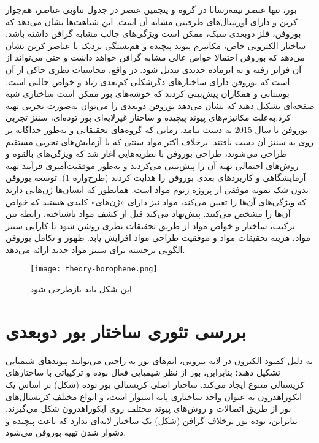 بور، تنها عنصر نیمه‌رسانا در گروه  و پنجمین عنصر در جدول تناوبی عناصر، هم‌جوار کربن و دارای اوربیتال‌های ظرفیتی مشابه آن است. \cite{forteInitioPredictionBoron2010}این شباهت‌ها نشان می‌دهد که بوروفن، فلز دوبعدی سبک، ممکن است ویژگی‌های جالب مشابه گرافن داشته باشد. \cite{huangTwoDimensionalBoronPolymorphs2017, liuIntermixingPeriodicSelfassembly2018} ساختار الکترونی خاص، مکانیزم پیوند پیچیده و هم‌بستگی نزدیک با عناصر کربن نشان می‌دهد که بوروفن احتمالا خواص عالی مشابه گرافن خواهد داشت و حتی می‌تواند از آن فراتر رفته و به ابرماده جدیدی تبدیل شود. در واقع، محاسبات نظری حاکی از آن است که بوروفن دارای ساختارهای دگرشکلی کم‌بعدی زیاد و خواص جالبی است. \cite{liuBorophenegrapheneHeterostructures2019} بوستانی و همکاران \cite{boustaniSYSTEMATICLSDINVESTIGATION1994} پیش‌بینی کردند که خوشه‌های بور ممکن است ساختاری شبه صفحه‌ای تشکیل دهند که نشان می‌دهد بوروفن دوبعدی را می‌توان به‌صورت تجربی تهیه کرد.به‌علت مکانیزم‌های پیوند پیچیده و ساختار غیرلایه‌ای بور توده‌ای، سنتز تجربی بوروفن تا سال 2015 به دست نیامد، زمانی که گروه‌های تحقیقاتی  \cite{mannixSynthesisBorophenesAnisotropic2015} و  \cite{fengExperimentalRealizationTwodimensional2016} به‌طور جداگانه بر روی  به سنتز آن دست یافتند. برخلاف اکثر مواد سنتی که با آزمایش‌های تجربی مستقیم طراحی می‌شوند، طراحی بوروفن با نظریه‌هایی آغاز شد که ویژگی‌های بالقوه و روش‌های احتمالی تهیه آن را پیش‌بینی می‌کردند و به‌طور موفقیت‌آمیزی فرآیند تهیه آزمایشگاهی و کاربردهای بعدی بوروفن را هدایت کردند (طرح‌واره 1). توسعه بوروفن بدون شک نمونه موفقی از پروژه ژنوم مواد  است. همانطور که انسان‌ها ژن‌هایی دارند که ویژگی‌های آن‌ها را تعیین می‌کند، مواد نیز دارای «ژن‌های» کلیدی هستند که خواص آن‌ها را مشخص می‌کنند.  پیش‌نهاد می‌کند قبل از کشف مواد ناشناخته، رابطه بین ترکیب، ساختار و خواص مواد از طریق تحقیقات نظری روشن شود تا کارایی سنتز مواد، هزینه تحقیقات مواد و موفقیت طراحی مواد افزایش یابد. ظهور و تکامل بوروفن الگویی برجسته برای سنتز مواد جدید ارائه می‌دهد.
\begin{figure*}
    \centering
    \texttt{[image: theory-borophene.png]}
    \caption{این شکل باید بازطرحی شود}
    \label{theoryborophene}
\end{figure*}
\section{بررسی تئوری ساختار بور دوبعدی}
به دلیل کمبود الکترون در لایه بیرونی، اتم‌های بور به راحتی می‌توانند پیوندهای شیمیایی تشکیل دهند؛ بنابراین، بور از نظر شیمیایی فعال بوده و ترکیباتی با ساختارهای کریستالی متنوع ایجاد می‌کند. ساختار اصلی کریستالی بور توده (شکل) بر اساس یک ایکوزاهدرون  به عنوان واحد ساختاری پایه استوار است، و انواع مختلف کریستال‌های بور از طریق اتصالات و روش‌های پیوند مختلف روی ایکوزاهدرون  شکل می‌گیرند. \cite{albertBoronElementaryChallenge2009} بنابراین، توده بور برخلاف گرافن (شکل) یک ساختار لایه‌ای ندارد که باعث پیچیده و دشوار شدن تهیه بوروفن می‌شود.

